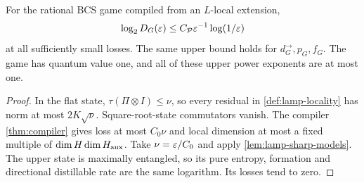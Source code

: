 \begin{theorem}\label{thm:local-lamp-ceiling}
For the rational BCS game compiled from an $L$-local extension,
\[
 \log_2D_G(\varepsilon)\le C_{\mathcal P}\varepsilon^{-1}\log(1/\varepsilon)
\]
at all sufficiently small losses. The same upper bound holds for $d_G^\to,p_G,f_G$. The game has quantum value one, and all of these upper power exponents are at most one.
\end{theorem}
\begin{proof}
In the flat state, $\tau(\Pi\otimes I)\le\nu$, so every residual in \cref{def:lamp-locality} has norm at most $2K\sqrt\nu$. Square-root-state commutators vanish. The compiler \cref{thm:compiler} gives loss at most $C_0\nu$ and local dimension at most a fixed multiple of $\dim H\dim H_{\rm aux}$. Take $\nu=\varepsilon/C_0$ and apply \cref{lem:lamp-sharp-models}. The upper state is maximally entangled, so its pure entropy, formation and directional distillable rate are the same logarithm. Its losses tend to zero.
\end{proof}


